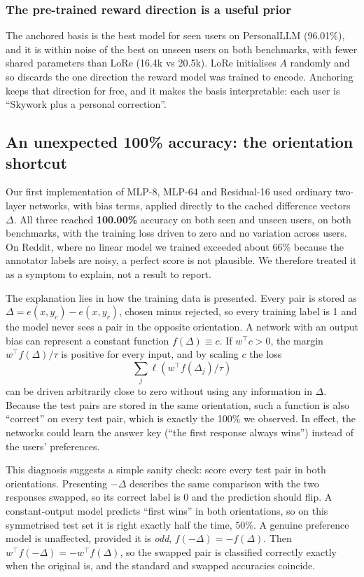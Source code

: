 \documentclass[11pt,a4paper]{article}
\begin{document}
\subsubsection*{The pre-trained reward direction is a useful prior}
The anchored basis is the best model for seen users on PersonalLLM (96.01\%), and it is within noise of
the best on unseen users on both benchmarks, with fewer shared parameters than LoRe (16.4k vs 20.5k).
LoRe initialises $A$ randomly and so discards the one direction the reward model was trained to
encode. Anchoring keeps that direction for free, and it makes the basis interpretable: each user is
``Skywork plus a personal correction''.

\subsection{An unexpected 100\% accuracy: the orientation shortcut}
\label{sec:shortcut}

Our first implementation of MLP-8, MLP-64 and Residual-16 used ordinary two-layer networks, with bias
terms, applied directly to the cached difference vectors $\Delta$. All three reached \textbf{100.00\%}
accuracy on both seen and unseen users, on both benchmarks, with the training loss driven to zero and
no variation across users. On Reddit, where no linear model we trained exceeded about 66\% because the
annotator labels are noisy, a perfect score is not plausible. We therefore treated it as a symptom to
explain, not a result to report.

The explanation lies in how the training data is presented. Every pair is stored as
$\Delta=e(x,y_c)-e(x,y_r)$, chosen minus rejected, so every training label is 1 and the model never
sees a pair in the opposite orientation. A network with an output bias can represent a constant
function $f(\Delta)\equiv c$. If $w^\top c>0$, the margin $w^\top f(\Delta)/\tau$ is positive for every
input, and by scaling $c$ the loss
\[
\sum_j \ell\!\left(w^\top f(\Delta_j)/\tau\right)
\]
can be driven arbitrarily close to zero without using any information in $\Delta$. Because the test
pairs are stored in the same orientation, such a function is also ``correct'' on every test pair,
which is exactly the 100\% we observed. In effect, the networks could learn the answer key (``the first
response always wins'') instead of the users' preferences.

This diagnosis suggests a simple sanity check: score every test pair in both orientations. Presenting
$-\Delta$ describes the same comparison with the two responses swapped, so its correct label is 0 and
the prediction should flip. A constant-output model predicts ``first wins'' in both orientations, so on
this symmetrised test set it is right exactly half the time, 50\%. A genuine preference model is
unaffected, provided it is \emph{odd}, $f(-\Delta)=-f(\Delta)$. Then $w^\top f(-\Delta)=-w^\top f(\Delta)$,
so the swapped pair is classified correctly exactly when the original is, and the standard and swapped
accuracies coincide.
\end{document}
